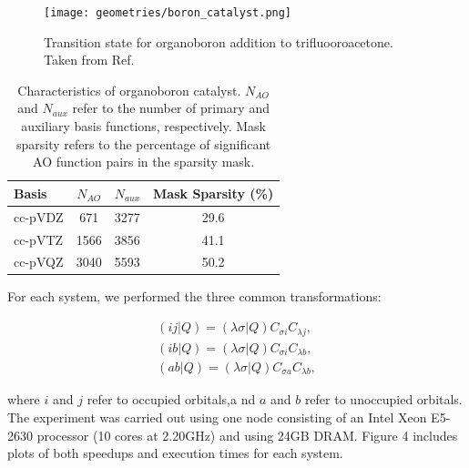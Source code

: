 \begin{figure}[H] 
\centering
\texttt{[image: geometries/boron\_catalyst.png]} \caption{Transition state for organoboron addition to trifluooroacetone. Taken from Ref. \cite{Lee:2016}} 
\label{fig:databases} \end{figure}

\begingroup
\begin{table}[H]
\centering
\renewcommand{\baselinestretch}{1}
\caption{Characteristics of organoboron catalyst.
$N_{AO}$ and $N_{aux}$ refer to the number of primary and auxiliary basis functions, respectively.
Mask sparsity refers to the percentage of significant AO function pairs in the sparsity mask.}
\begin{tabular}{l ccc}
\multicolumn{1}{l}{\textbf{Basis}} &
\multicolumn{1}{c}{\textbf{$N_{AO}$}} &
\multicolumn{1}{c}{\textbf{$N_{aux}$}} &
\multicolumn{1}{c}{\textbf{Mask Sparsity (\%)}} \\
\hline
cc-pVDZ   & 671  & 3277 & 29.6 \\          
cc-pVTZ   & 1566 & 3856 & 41.1 \\          
cc-pVQZ   & 3040 & 5593 & 50.2 \\          
\end{tabular}
\end{table}
\endgroup


\noindent For each system, we performed the three common transformations:

\begin{align} 
(i j | Q) = (\lambda \sigma | Q) C_{\sigma i} C_{\lambda j} , \\
(i b | Q) = (\lambda \sigma | Q) C_{\sigma i} C_{\lambda b} , \\
(a b | Q) = (\lambda \sigma | Q) C_{\sigma a} C_{\lambda b} , 
\end{align}

\noindent where $i$ and $j$ refer to occupied orbitals,a nd $a$ and $b$ refer to unoccupied orbitals.
The experiment was carried out using one node consisting of an Intel Xeon E5-2630 processor 
(10 cores at 2.20GHz) and using 24GB DRAM. Figure 4 includes plots of both speedups and execution times for each system.

